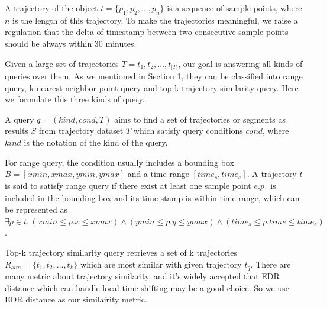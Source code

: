 \documentclass[conference]{IEEEtran}
\begin{document}
	\begin{define}[trajectory]
		A trajectory of the object $t=\{p_{1},p_{2},\ldots,p_{n}\}$ is a sequence of sample points, where $n$ is the length of this trajectory. To make the trajectories meaningful, we raise a regulation that the delta of timestamp between two consecutive sample points should be always within 30 minutes. 
	\end{define}

	Given a large set of trajectories $T={t_{1},t_{2},\ldots,t_{|T|}}$, our goal is answering all kinds of queries over them. As we mentioned in Section 1, they can be classified into range query, k-nearest neighbor point query and top-k trajectory similarity query. Here we formulate this three kinds of query.
	
	\begin{define}[query]
		A query $q=(kind,cond,T)$ aims to find a set of trajectories or segments as results $S$ from trajectory dataset $T$ which satisfy query conditions $cond$, where $kind$ is the notation of the kind of the query.
	\end{define}
	
	For range query, the condition usually includes a bounding box $B=[xmin,xmax,ymin,ymax]$ and a time range $[time_{s},time_{e}]$. A trajectory $t$ is said to satisfy range query if there exist at least one sample point $e.p_{1}$ is included in the bounding box and its time stamp is within time range, which can be represented as $\exists p\in t, (xmin \leq p.x \leq xmax) \wedge (ymin \leq p.y \leq ymax) \wedge (time_{s} \leq p.time \leq time_{e})$. 

	
	
	
	Top-k trajectory similarity query retrieves a set of k trajectories $R_{sim}=\{t_{1},t_{2},\ldots ,t_{k}\}$ which are most similar with given trajectory $t_{q}$. There are many metric about trajectory similarity, and it's widely accepted that EDR distance\cite{DBLP:conf/sigmod/ChenOO05} which can handle local time shifting may be a good choice. So we use EDR distance as our similairity metric.
	
\end{document}
